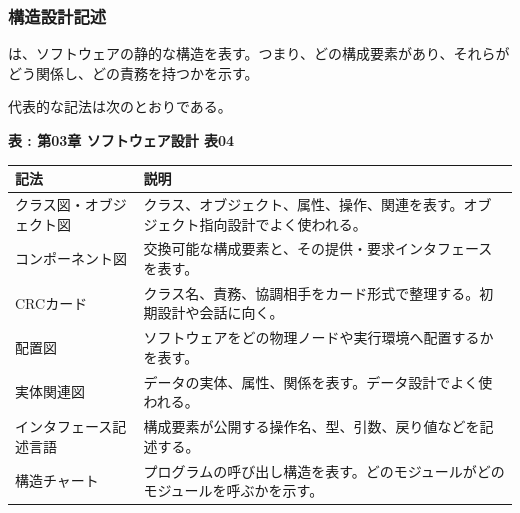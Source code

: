 \subsubsection{構造設計記述}

 は、ソフトウェアの静的な構造を表す。つまり、どの構成要素があり、それらがどう関係し、どの責務を持つかを示す。

代表的な記法は次のとおりである。

\par\smallskip\noindent{}\label{tab:ch03-04}\textbf{表 \thetable: 第03章 ソフトウェア設計 表04}\par\smallskip
\begin{longtable}{L{42mm}L{112mm}}
\toprule
\textbf{記法} & \textbf{説明} \\
\midrule
\endhead
クラス図・オブジェクト図 & クラス、オブジェクト、属性、操作、関連を表す。オブジェクト指向設計でよく使われる。 \\
コンポーネント図 & 交換可能な構成要素と、その提供・要求インタフェースを表す。 \\
CRCカード & クラス名、責務、協調相手をカード形式で整理する。初期設計や会話に向く。 \\
配置図 & ソフトウェアをどの物理ノードや実行環境へ配置するかを表す。 \\
実体関連図 & データの実体、属性、関係を表す。データ設計でよく使われる。 \\
インタフェース記述言語 & 構成要素が公開する操作名、型、引数、戻り値などを記述する。 \\
構造チャート & プログラムの呼び出し構造を表す。どのモジュールがどのモジュールを呼ぶかを示す。 \\
\bottomrule
\end{longtable}
